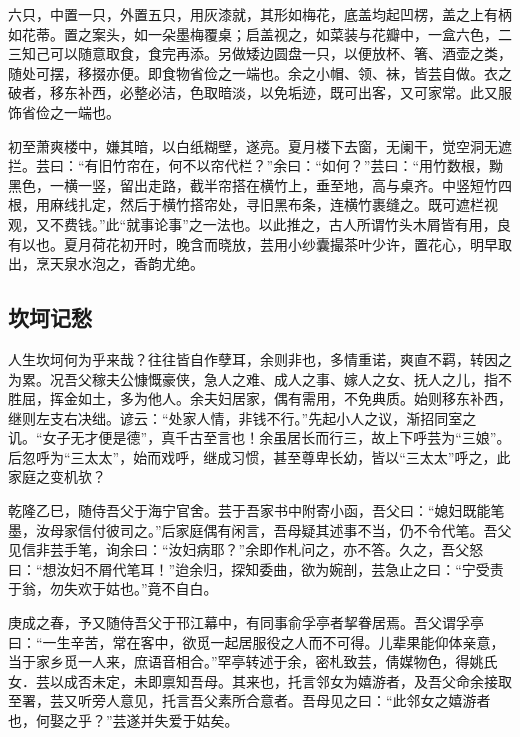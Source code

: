 \documentclass[]{article}
\begin{document}
六只，中置一只，外置五只，用灰漆就，其形如梅花，底盖均起凹楞，盖之上有柄如花蒂。置之案头，如一朵墨梅覆桌；启盖视之，如菜装与花瓣中，一盒六色，二三知己可以随意取食，食完再添。另做矮边圆盘一只，以便放杯、箸、酒壶之类，随处可摆，移掇亦便。即食物省俭之一端也。余之小帽、领、袜，皆芸自做。衣之破者，移东补西，必整必洁，色取暗淡，以免垢迹，既可出客，又可家常。此又服饰省俭之一端也。

初至萧爽楼中，嫌其暗，以白纸糊壁，遂亮。夏月楼下去窗，无阑干，觉空洞无遮拦。芸曰：``有旧竹帘在，何不以帘代栏？''余曰：``如何？''芸曰：``用竹数根，黝黑色，一横一竖，留出走路，截半帘搭在横竹上，垂至地，高与桌齐。中竖短竹四根，用麻线扎定，然后于横竹搭帘处，寻旧黑布条，连横竹裹缝之。既可遮栏视观，又不费钱。''此``就事论事''之一法也。以此推之，古人所谓竹头木屑皆有用，良有以也。夏月荷花初开时，晚含而晓放，芸用小纱囊撮茶叶少许，置花心，明早取出，烹天泉水泡之，香韵尤绝。

\hypertarget{header-n21}{%
\subsection{坎坷记愁}\label{header-n21}}

人生坎坷何为乎来哉？往往皆自作孽耳，余则非也，多情重诺，爽直不羁，转因之为累。况吾父稼夫公慷慨豪侠，急人之难、成人之事、嫁人之女、抚人之儿，指不胜屈，挥金如土，多为他人。余夫妇居家，偶有需用，不免典质。始则移东补西，继则左支右决绌。谚云：``处家人情，非钱不行。''先起小人之议，渐招同室之讥。``女子无才便是德''，真千古至言也！余虽居长而行三，故上下呼芸为``三娘''。后忽呼为``三太太''，始而戏呼，继成习惯，甚至尊卑长幼，皆以``三太太''呼之，此家庭之变机欤？

乾隆乙巳，随侍吾父于海宁官舍。芸于吾家书中附寄小函，吾父曰：``媳妇既能笔墨，汝母家信付彼司之。''后家庭偶有闲言，吾母疑其述事不当，仍不令代笔。吾父见信非芸手笔，询余曰：``汝妇病耶？''余即作札问之，亦不答。久之，吾父怒曰：``想汝妇不屑代笔耳！''迨余归，探知委曲，欲为婉剖，芸急止之曰：``宁受责于翁，勿失欢于姑也。''竟不自白。

庚成之春，予又随侍吾父于邗江幕中，有同事俞孚亭者挈眷居焉。吾父谓孚亭曰：``一生辛苦，常在客中，欲觅一起居服役之人而不可得。儿辈果能仰体亲意，当于家乡觅一人来，庶语音相合。''罕亭转述于余，密札致芸，倩媒物色，得姚氏女．芸以成否未定，未即禀知吾母。其来也，托言邻女为嬉游者，及吾父命余接取至署，芸又听旁人意见，托言吾父素所合意者。吾母见之曰：``此邻女之嬉游者也，何娶之乎？''芸遂并失爱于姑矣。
\end{document}
